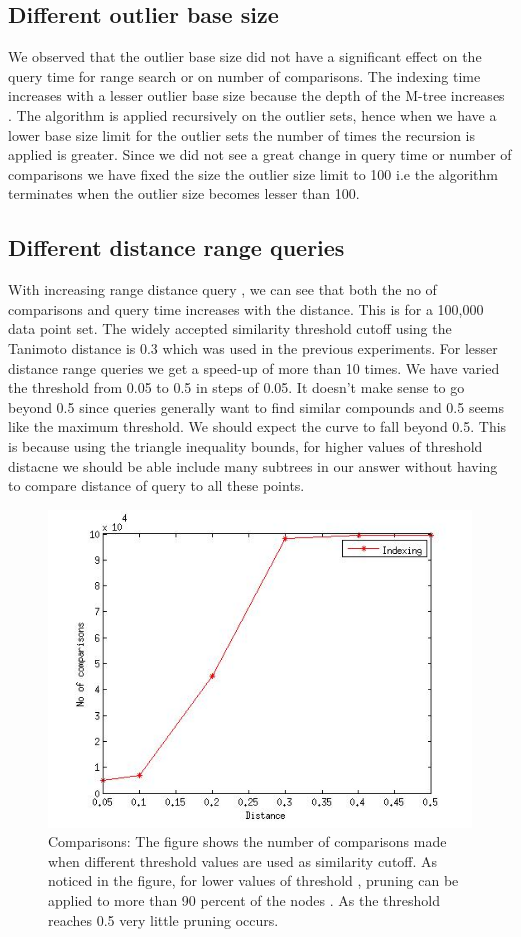 \subsection{Different outlier base size}

We observed that the outlier base size did not have a significant effect on the query time for range search or on number of comparisons. The indexing time increases with a lesser outlier base size because the depth of the M-tree increases . The algorithm is applied recursively on the outlier sets, hence when we have a lower base size limit for the outlier sets the number of times the recursion is applied is greater. Since we did not see a great change in query time or number of comparisons we have fixed the size the outlier size limit to 100 i.e the algorithm terminates when the outlier size becomes lesser than 100.

\subsection{Different distance range queries}

With increasing range distance query , we can see that  both the no of comparisons and query time increases with the distance. This is for a 100,000 data point set. The widely accepted similarity threshold cutoff using the Tanimoto distance is 0.3 which was used in the previous experiments. For lesser distance range queries we get a speed-up of more than 10 times. We have varied the threshold from 0.05 to 0.5 in steps of 0.05. It doesn't make sense to go beyond 0.5 since queries generally want to find similar compounds and 0.5 seems like the maximum threshold. We should expect the curve to fall beyond 0.5. This is because using the triangle inequality bounds, for higher values of threshold distacne we should be able include many subtrees in our answer without having to compare distance of query to all these points. 

\begin{figure}[ht!]	
\centering
\includegraphics[width=0.35 \columnwidth]{img/comparisons_100k_500p_100o_differentdist.jpg}
\caption{Comparisons: The figure shows the number of comparisons made when different threshold values are used as similarity cutoff. As noticed in the figure, for lower values of threshold , pruning can be applied to more than 90 percent of the nodes . As the threshold reaches 0.5 very little pruning occurs.}
\end{figure}

